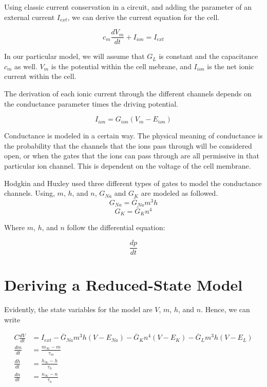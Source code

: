 \documentclass{article}
\begin{document}
Using classic current conservation in a circuit, and adding the parameter of an external current $I_{ext}$, we can derive the current equation for the cell.

\begin{equation}
c_m\frac{dV_m}{dt} + I_{ion} = I_{ext}
\end{equation}

In our particular model, we will assume that $G_L$ is constant and the capacitance $c_m$ as well. $V_m$ is the potential within the cell mebrane, and $I_{ion}$ is the net ionic current within the cell.

The derivation of each ionic current through the different channels depends on the conductance parameter times the driving potential.

\begin{equation}
    I_{ion} = G_{ion}(V_{m}-E_{ion})
\end{equation}

Conductance is modeled in a certain way. The physical meaning of conductance is the probability that the channels that the ions pass through will be considered open, or when the gates that the ions can pass through are all permissive in that particular ion channel. This is dependent on the voltage of the cell membrane. 

Hodgkin and Huxley used three different types of gates to model the conductance channels. Using, $m$, $h$, and $n$, $G_{Na}$ and $G_K$ are modeled as followed.
\begin{equation}
    G_{Na} = \bar{G}_{Na}m^3h
\end{equation}
\begin{equation}
    G_{K} = \bar{G}_{K}n^4
\end{equation}

Where $m$, $h$, and $n$ follow the differential equation:

\begin{equation}
    \frac{dp}{dt} 
\end{equation}

\section{Deriving a Reduced-State Model}

Evidently, the state variables for the model are $V$, $m$, $h$, and $n$. Hence, we can write

\begin{align*}
    C\frac{dV}{dt} &= I_{ext} -\bar{G}_{Na}m^3h(V-E_{Na}) -\bar{G}_{K}n^4(V-E_{K})  -\bar{G}_{L}m^3h(V-E_{L}) \\
    \frac{dm}{dt} &= \frac{m_{\infty}-m}{\tau_m} \\
    \frac{dh}{dt} &= \frac{h_{\infty}-h}{\tau_h} \\
    \frac{dn}{dt} &= \frac{n_{\infty}-n}{\tau_n} 
\end{align*}
\end{document}

